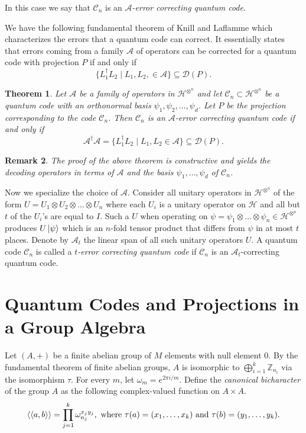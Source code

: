 \documentclass{Rinton-P9x6}
\newtheorem{theorem}{Theorem}[section]
\newtheorem{remark}[theorem]{Remark}
\newcommand {\ket} [1] {\ensuremath \left\vert#1\ensuremath \right\rangle}
\newcommand{\Ints}{{\mathbb{Z}}}
\newcommand{\om}{{\omega}}
\newcommand{\Hi}{{\ensuremath{\mathcal{H}}}}
\newcommand{\A}{{\ensuremath{\mathcal{A}}}}
\newcommand{\C}{{\ensuremath{\mathcal{C}}}}
\newcommand{\Hin}{{\ensuremath{\mathcal{H}^{\otimes^n}}}}
\newcommand{\D}{{\ensuremath{\mathcal{D}}}}
\newcommand{\biangle}[1]{\langle\langle #1\rangle\rangle}
\begin{document}
In this case we say that $\C_n$ is an \emph{$\A$-error correcting
quantum code}. 

We have the following fundamental theorem of Knill and
Laflamme\cite{KL} which characterizes the errors that a quantum code
can correct.  It essentially states that errors coming from a family
$\A$ of operators can be corrected for a quantum code with projection
$P$ if and only if
\[
\{L_1^{\dag}L_2\mid L_1, L_2,\in\A\}\subseteq\D(P).
\]

\begin{theorem}\label{kl-theorem}
  Let $\A$ be a family of operators in $\Hin$ and let $\C_n\subset
  \Hin$ be a quantum code with an orthonormal basis
  $\psi_1,\psi_2,\ldots,\psi_d$. Let $P$ be the projection
  corresponding to the code $\C_n$. Then $\C_n$ is an $\A$-error
  correcting quantum code if and only if
\[
\mathcal{A}^\dag \mathcal{A} = \{L_1^{\dag}L_2\mid L_1, L_2\in\A\}\subseteq\D(P).
\]
\end{theorem}

\begin{remark}
  The proof of the above theorem is constructive and yields the
  decoding operators in terms of $\A$ and the basis
  $\psi_1,\ldots,\psi_d$ of $\C_n$.
\end{remark}

Now we specialize the choice of $\A$. Consider all unitary operators
in $\Hin$ of the form $U=U_1\otimes U_2\otimes\ldots\otimes U_n$ where
each $U_i$ is a unitary operator on $\Hi$ and all but $t$ of the
$U_i$'s are equal to $I$. Such a $U$ when operating on
$\psi=\psi_1\otimes\ldots\otimes \psi_n\in\Hin$ produces $U\ket{\psi}$
which is an $n$-fold tensor product that differs {from} $\psi$ in at
most $t$ places. Denote by $\A_t$ the linear span of all such unitary
operators $U$. A quantum code $\C_n$ is called a \emph{$t$-error
  correcting quantum code} if $\C_n$ is an $\A_t$-correcting quantum
code. 

\section{Quantum Codes and Projections in a Group Algebra}\label{defs}

Let $(A,+)$ be a finite abelian group of $M$ elements with null
element 0. By the fundamental theorem of finite abelian groups, $A$ is
isomorphic to $\bigoplus_{i=1}^k\Ints_{n_i}$ via the isomorphism
$\tau$. For every $m$, let $\om_m=e^{2\pi i/m}$. Define the
\emph{canonical bicharacter} of the group $A$ as the following
complex-valued function on $A\times A$.
\[
\biangle{a,b}=\prod_{j=1}^k \om_{n_j}^{x_jy_j},\mbox{ where }\\
\tau(a)=(x_1,\ldots,x_k)\mbox{ and }\tau(b)=(y_1,\ldots,y_k).
\]
\end{document}
